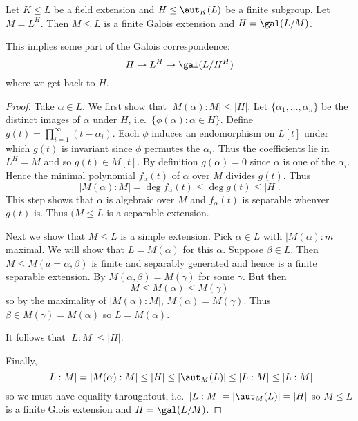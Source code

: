 \documentclass[a4paper]{article}
\begin{document}
\begin{theorem}[Artin's]
  \label{thm:artin}
  Let \(K \leq L\) be a field extension and \(H \leq \aut_K(L)\) be a finite subgroup. Let \(M = L^H\). Then \(M \leq L\) is a finite Galois extension and \(H = \gal(L/M)\).
\end{theorem}

\begin{remark}
  This implies some part of the Galois correspondence:
  \[
    H \to L^H \to \gal(L/H^H)
  \]
  where we get back to \(H\).
\end{remark}

\begin{proof}
  Take \(\alpha \in L\). We first show that \(|M(\alpha):M| \leq |H|\). Let \(\{\alpha_1, \dots, \alpha_n\}\) be the distinct images of \(\alpha\) under \(H\), i.e.\ \(\{\phi(\alpha): \alpha \in H\}\). Define \(g(t) = \prod_{i = 1}^{\infty} (t - \alpha_i) \). Each \(\phi\) induces an endomorphism on \(L[t]\) under which \(g(t)\) is invariant since \(\phi\) permutes the \(\alpha_i\). Thus the coefficients lie in \(L^H = M\) and so \(g(t) \in M[t]\). By definition \(g(\alpha) = 0\) since \(\alpha\) is one of the \(\alpha_i\). Hence the minimal polynomial \(f_\alpha(t)\) of \(\alpha\) over \(M\) divides \(g(t)\). Thus
  \[
    |M(\alpha):M| = \deg f_\alpha(t) \leq \deg g(t) \leq |H|.
  \]
  This step shows that \(\alpha\) is algebraic over \(M\) and \(f_\alpha(t)\) is separable whenver \(g(t)\) is. Thus \((M \leq L\) is a separable extension.

  Next we show that \(M \leq L\) is a simple extension. Pick \(\alpha \in L\) with \(|M(\alpha):m|\) maximal. We will show that \(L = M(\alpha)\) for this \(\alpha\). Suppose \(\beta \in L\). Then \(M \leq M(a=\alpha, \beta)\) is finite and separably generated and hence is a finite separable extension. By  \(M(\alpha, \beta) = M(\gamma)\) for some \(\gamma\). But then
  \[
    M \leq M(\alpha) \leq M(\gamma)
  \]
  so by the maximality of \(|M(\alpha):M|\), \(M(\alpha) = M(\gamma)\). Thus \(\beta \in M(\gamma) = M(\alpha)\) so \(L = M(\alpha)\).

  It follows that \(|L:M| \leq |H|\).

  Finally,
  \[
    |L:M| = |M(\alpha):M| \leq |H| \leq |\aut_M(L)| \leq |L:M| \leq |L:M|
  \]
  so we must have equality throughtout, i.e.\ \(|L:M| = |\aut_M(L)| = |H|\) so \(M \leq L\) is a finite Glois extension and \(H = \gal(L/M)\).
\end{proof}
\end{document}
